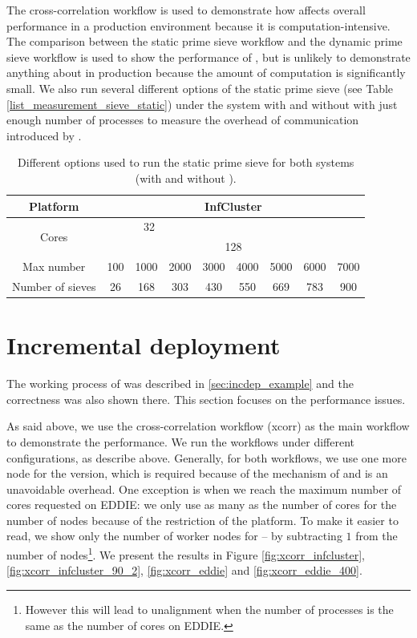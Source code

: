The cross-correlation workflow is used to demonstrate how \tincdep affects overall performance in a production environment because it is computation-intensive. The comparison between the static prime sieve workflow and the dynamic prime sieve workflow is used to show the performance of \tdynexp, but is unlikely to demonstrate anything about \tincdep in production because the amount of computation is significantly small. We also run several different options of the static prime sieve (see Table \ref{list_measurement_sieve_static}) under the \dpy system with and without \tincdep with just enough number of processes to measure the overhead of communication introduced by \tincdep.

\begin{table}[h]
\centering
\begin{tabular}{ccccccccc}
\hline
Platform & \multicolumn{8}{c}{InfCluster} \\ \hline
\multirow{2}{*}{Cores} &
\multicolumn{3}{c|}{32} \\ \cline{2-9}
& \multicolumn{8}{c}{128} \\ \hline
Max number & 100 & 1000 & 2000 & 3000 & 4000 & 5000 & 6000 & 7000 \\ \hline
Number of sieves & 26 & 168 & 303 & 430 & 550 & 669 & 783 & 900 \\ \hline
\end{tabular}
\caption{Different options used to run the static prime sieve for both systems (with and without \tincdep).}
\label{tbl:list_measurement_sieve_static}
\end{table}

\section{Incremental deployment}
The working process of \tincdep was described in \ref{sec:incdep_example} and the correctness was also shown there. This section focuses on the performance issues.

As said above, we use the cross-correlation workflow (xcorr) as the main workflow to demonstrate the performance. We run the workflows under different configurations, as describe above. Generally, for both workflows, we use one more node for the \tincdep version, which is required because of the mechanism of \tincdep and is an unavoidable overhead. One exception is when we reach the maximum number of cores requested on EDDIE: we only use as many as the number of cores for the number of nodes because of the restriction of the platform. To make it easier to read, we show only the number of worker nodes for \tincdep -- by subtracting $1$ from the number of nodes\footnote{However this will lead to unalignment when the number of processes is the same  as the number of cores on EDDIE.}. We present the results in Figure \ref{fig:xcorr_infcluster}, \ref{fig:xcorr_infcluster_90_2}, \ref{fig:xcorr_eddie} and \ref{fig:xcorr_eddie_400}.

